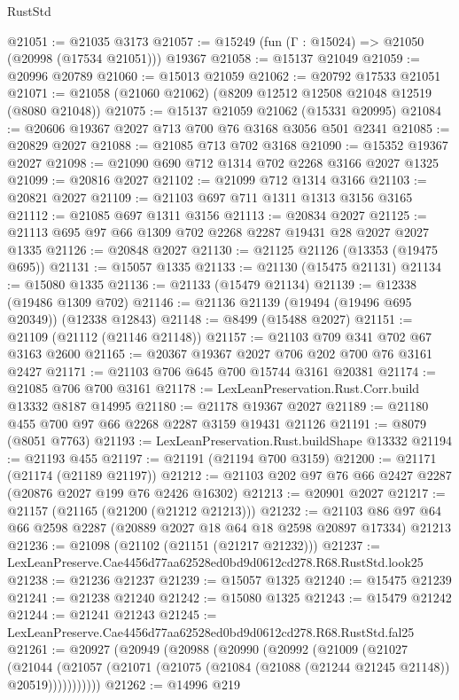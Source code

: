 \begin{lexlean}{RustStd}
\begin{coremodule}
@21051 := @21035 @3173
@21057 := @15249 (fun (Γ : @15024) => @21050 (@20998 (@17534 @21051))) @19367
@21058 := @15137 @21049
@21059 := @20996 @20789
@21060 := @15013 @21059
@21062 := @20792 @17533 @21051
@21071 := @21058 (@21060 @21062) (@8209 @12512 @12508 @21048 @12519 (@8080 @21048))
@21075 := @15137 @21059 @21062 (@15331 @20995)
@21084 := @20606 @19367 @2027 @713 @700 @76 @3168 @3056 @501 @2341
@21085 := @20829 @2027
@21088 := @21085 @713 @702 @3168
@21090 := @15352 @19367 @2027
@21098 := @21090 @690 @712 @1314 @702 @2268 @3166 @2027 @1325
@21099 := @20816 @2027
@21102 := @21099 @712 @1314 @3166
@21103 := @20821 @2027
@21109 := @21103 @697 @711 @1311 @1313 @3156 @3165
@21112 := @21085 @697 @1311 @3156
@21113 := @20834 @2027
@21125 := @21113 @695 @97 @66 @1309 @702 @2268 @2287 @19431 @28 @2027 @2027 @1335
@21126 := @20848 @2027
@21130 := @21125 @21126 (@13353 (@19475 @695))
@21131 := @15057 @1335
@21133 := @21130 (@15475 @21131)
@21134 := @15080 @1335
@21136 := @21133 (@15479 @21134)
@21139 := @12338 (@19486 @1309 @702)
@21146 := @21136 @21139 (@19494 (@19496 @695 @20349)) (@12338 @12843)
@21148 := @8499 (@15488 @2027)
@21151 := @21109 (@21112 (@21146 @21148))
@21157 := @21103 @709 @341 @702 @67 @3163 @2600
@21165 := @20367 @19367 @2027 @706 @202 @700 @76 @3161 @2427
@21171 := @21103 @706 @645 @700 @15744 @3161 @20381
@21174 := @21085 @706 @700 @3161
@21178 := LexLeanPreservation.Rust.Corr.build @13332 @8187 @14995
@21180 := @21178 @19367 @2027
@21189 := @21180 @455 @700 @97 @66 @2268 @2287 @3159 @19431 @21126
@21191 := @8079 (@8051 @7763)
@21193 := LexLeanPreservation.Rust.buildShape @13332
@21194 := @21193 @455
@21197 := @21191 (@21194 @700 @3159)
@21200 := @21171 (@21174 (@21189 @21197))
@21212 := @21103 @202 @97 @76 @66 @2427 @2287 (@20876 @2027 @199 @76 @2426 @16302)
@21213 := @20901 @2027
@21217 := @21157 (@21165 (@21200 (@21212 @21213)))
@21232 := @21103 @86 @97 @64 @66 @2598 @2287 (@20889 @2027 @18 @64 @18 @2598 @20897 @17334) @21213
@21236 := @21098 (@21102 (@21151 (@21217 @21232)))
@21237 := LexLeanPreserve.Cae4456d77aa62528ed0bd9d0612cd278.R68.RustStd.look25
@21238 := @21236 @21237
@21239 := @15057 @1325
@21240 := @15475 @21239
@21241 := @21238 @21240
@21242 := @15080 @1325
@21243 := @15479 @21242
@21244 := @21241 @21243
@21245 := LexLeanPreserve.Cae4456d77aa62528ed0bd9d0612cd278.R68.RustStd.fal25
@21261 := @20927
    (@20949
      (@20988
        (@20990
          (@20992
            (@21009
              (@21027
                (@21044
                  (@21057 (@21071 (@21075 (@21084 (@21088 (@21244 @21245 @21148)) @20519)))))))))))
@21262 := @14996 @219

\end{coremodule}
\end{lexlean}
